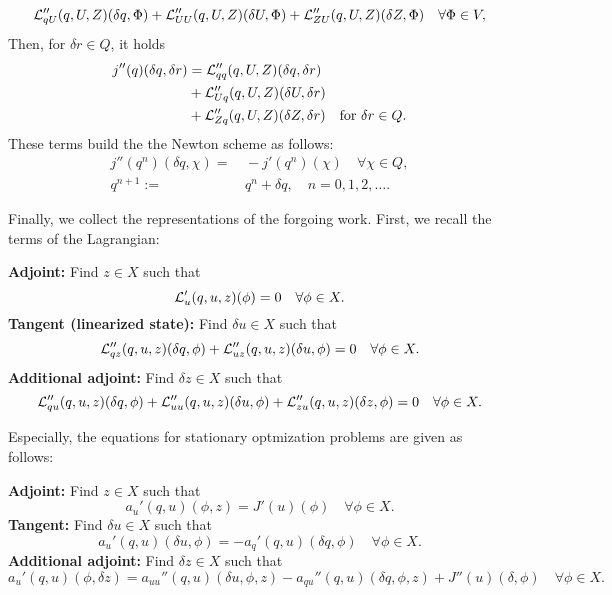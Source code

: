 \begin{equation*}
{\cal L}_{qU}'' (q,U,Z)(\delta q,\Phi) + {\cal L}_{UU}'' 
(q,U,Z)(\delta U,\Phi) + {\cal L}_{ZU}'' (q,U,Z)(\delta Z,\Phi)
\quad\forall \Phi\in V,
\end{equation*}
Then, for $\delta r\in Q$, it holds
\begin{align*}
j''(q)(\delta q, \delta r) 
&= {\cal L}_{qq}'' (q,U,Z)(\delta q,\delta r) \\
&+ {\cal L}_{Uq}'' (q,U,Z)(\delta U,\delta r) \\ 
&+ {\cal L}_{Zq}'' (q,U,Z)(\delta Z,\delta r) \quad \text{for }\delta r\in Q.
\end{align*}
These terms build the the Newton scheme as follows:
\begin{align*}
j''(q^n )(\delta q,\chi ) =&\, -j'(q^n)(\chi) \quad\forall\chi \in Q,\\
q^{n+1} :=&\, q^n + \delta q , \quad n=0,1,2,\ldots .
\end{align*}



Finally, we collect the representations of the forgoing work. First, we recall 
the terms of the Lagrangian:

\textbf{Adjoint:} Find $z\in X$ such that
\begin{equation*}
{\cal L}_u' (q,u,z)(\phi) = 0 \quad \forall\phi\in X. 
\end{equation*}
\textbf{Tangent (linearized state):} Find $\delta u\in X$ such that
\begin{equation*}
{\cal L}_{qz}'' (q,u,z)(\delta q, \phi) +
{\cal L}_{uz}'' (q,u,z)(\delta u, \phi) = 0 \quad \forall\phi\in X. 
\end{equation*}
\textbf{Additional adjoint:} Find $\delta z\in X$ such that
\begin{equation*}
{\cal L}_{qu}'' (q,u,z)(\delta q, \phi) +
{\cal L}_{uu}'' (q,u,z)(\delta u, \phi) +
{\cal L}_{zu}'' (q,u,z)(\delta z, \phi) = 0 \quad \forall\phi\in X. 
\end{equation*}

Especially, the equations for stationary optmization problems are
given as follows:

\textbf{Adjoint:} Find $z\in X$ such that
\begin{equation*}
a_u'(q,u)(\phi,z) = J'(u)(\phi) \quad \forall\phi\in X. 
\end{equation*}
\textbf{Tangent:} Find $\delta u\in X$ such that
\begin{equation*}
a_u'(q,u)(\delta u,\phi) = -a_q'(q,u)(\delta q,\phi)  \quad \forall\phi\in X. 
\end{equation*}
\textbf{Additional adjoint:} Find $\delta z\in X$ such that
\begin{equation*}
a_u'(q,u)(\phi,\delta z) = a_{uu}''(q,u)(\delta u,\phi,z)
-a_{qu}''(q,u)(\delta q,\phi,z) + J''(u)(\delta,\phi) \quad \forall\phi\in X. 
\end{equation*}


